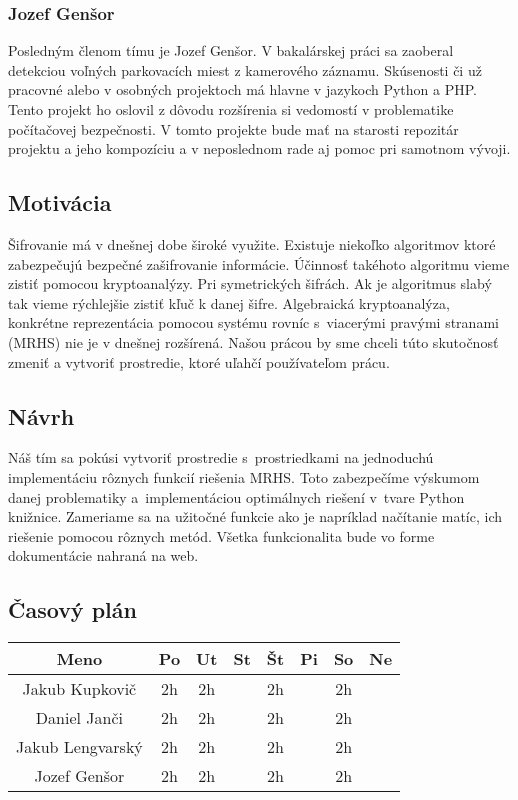 \subsubsection{Jozef Genšor}
Posledným členom tímu je Jozef Genšor. V bakalárskej práci sa zaoberal detekciou voľných parkovacích miest z kamerového záznamu. Skúsenosti či už pracovné alebo v osobných projektoch má hlavne v jazykoch Python a PHP. Tento projekt ho oslovil z dôvodu rozšírenia si vedomostí v problematike počítačovej bezpečnosti. V tomto projekte bude mať na starosti repozitár projektu a jeho kompozíciu a v neposlednom rade aj pomoc pri samotnom vývoji.
\subsection{Motivácia}
Šifrovanie má v dnešnej dobe široké využite.  Existuje niekoľko algoritmov ktoré zabezpečujú bezpečné zašifrovanie informácie. Účinnosť takéhoto algoritmu vieme zistiť pomocou kryptoanalýzy. Pri symetrických šifrách. Ak je algoritmus slabý tak vieme rýchlejšie zistiť kľuč k danej šifre. Algebraická kryptoanalýza, konkrétne reprezentácia pomocou systému rovníc s viacerými pravými stranami (MRHS) nie je v dnešnej rozšírená. Našou prácou by sme chceli túto skutočnosť zmeniť a vytvoriť prostredie, ktoré uľahčí používateľom prácu.
\subsection{Návrh}
Náš tím sa pokúsi vytvoriť prostredie s prostriedkami na jednoduchú implementáciu rôznych funkcií riešenia MRHS. Toto zabezpečíme výskumom danej problematiky a implementáciou optimálnych riešení v tvare Python knižnice. Zameriame sa na užitočné funkcie ako je napríklad načítanie matíc, ich riešenie pomocou rôznych metód.
Všetka funkcionalita bude vo forme dokumentácie nahraná na web.
\subsection{Časový plán}
\begin{center}
\begin{tabular}{||c c c c c c c c||} 
 \hline
 Meno & Po & Ut & St & Št & Pi & So & Ne \\ [0.5ex] 
 \hline\hline
 Jakub Kupkovič & 2h & 2h &  & 2h &  & 2h & \\ 
 \hline
 Daniel Janči & 2h & 2h &  & 2h &  & 2h & \\
 \hline
 Jakub Lengvarský & 2h & 2h &  & 2h &  & 2h & \\
 \hline
 Jozef Genšor & 2h & 2h &  & 2h &  & 2h & \\
 \hline
\end{tabular}
\end{center}
